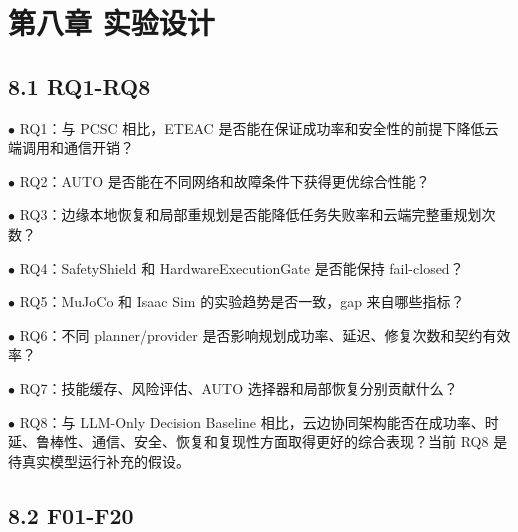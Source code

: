 \chapter{第八章 实验设计}

\section{8.1 RQ1-RQ8}

\noindent $\bullet$ RQ1：与 PCSC 相比，ETEAC 是否能在保证成功率和安全性的前提下降低云端调用和通信开销？\par
\noindent $\bullet$ RQ2：AUTO 是否能在不同网络和故障条件下获得更优综合性能？\par
\noindent $\bullet$ RQ3：边缘本地恢复和局部重规划是否能降低任务失败率和云端完整重规划次数？\par
\noindent $\bullet$ RQ4：SafetyShield 和 HardwareExecutionGate 是否能保持 fail-closed？\par
\noindent $\bullet$ RQ5：MuJoCo 和 Isaac Sim 的实验趋势是否一致，gap 来自哪些指标？\par
\noindent $\bullet$ RQ6：不同 planner/provider 是否影响规划成功率、延迟、修复次数和契约有效率？\par
\noindent $\bullet$ RQ7：技能缓存、风险评估、AUTO 选择器和局部恢复分别贡献什么？\par
\noindent $\bullet$ RQ8：与 LLM-Only Decision Baseline 相比，云边协同架构能否在成功率、时延、鲁棒性、通信、安全、恢复和复现性方面取得更好的综合表现？当前 RQ8 是待真实模型运行补充的假设。\par

\section{8.2 F01-F20}

